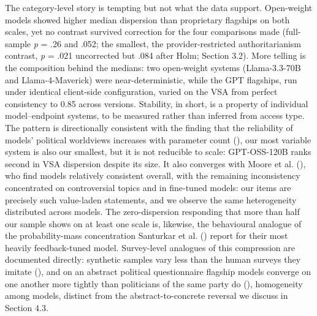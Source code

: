 \documentclass[
]{article}
\begin{document}
The category-level story is tempting but not what the data support.
Open-weight models showed higher median dispersion than proprietary
flagships on both scales, yet no contrast survived correction for the
four comparisons made (full-sample \emph{p} = .26 and .052; the
smallest, the provider-restricted authoritarianism contrast, \emph{p} =
.021 uncorrected but .084 after Holm; Section 3.2). More telling is the
composition behind the medians: two open-weight systems (Llama-3.3-70B
and Llama-4-Maverick) were near-deterministic, while the GPT flagships,
run under identical client-side configuration, varied on the VSA from
perfect consistency to 0.85 across versions. Stability, in short, is a
property of individual model--endpoint systems, to be measured rather
than inferred from access type. The pattern is directionally consistent
with the finding that the reliability of models' political worldviews
increases with parameter count (), our most variable system is also our smallest, but it is not
reducible to scale: GPT-OSS-120B ranks second in VSA dispersion despite
its size. It also converges with Moore et al.
(), who find models relatively consistent
overall, with the remaining inconsistency concentrated on controversial
topics and in fine-tuned models: our items are precisely such
value-laden statements, and we observe the same heterogeneity
distributed across models. The zero-dispersion responding that more than
half our sample shows on at least one scale is, likewise, the
behavioural analogue of the probability-mass concentration Santurkar et
al. () report for their most heavily
feedback-tuned model. Survey-level analogues of this compression are
documented directly: synthetic samples vary less than the human surveys
they imitate (), and on an
abstract political questionnaire flagship models converge on one another
more tightly than politicians of the same party do
(), homogeneity among
models, distinct from the abstract-to-concrete reversal we discuss in
Section 4.3.
\end{document}
